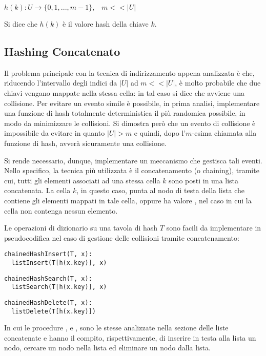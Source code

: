 \(h(k):U\to \{0,1,..., m-1\},\;\;\; m<<|U|\)

Si dice che \(h(k)\) è il valore hash della chiave \(k\).

\subsection{Hashing Concatenato}

Il problema principale con la tecnica di indirizzamento appena analizzata è che, riducendo l'intervallo degli indici da \(|U|\) ad \(m<<|U|\), è molto probabile che due chiavi vengano mappate nella stessa cella: in tal caso si dice che avviene una collisione. Per evitare un evento simile è possibile, in prima analisi, implementare una funzione di hash totalmente deterministica il più randomica possibile, in modo da minimizzare le collisioni. Si dimostra però che un evento di collisione è impossibile da evitare in quanto \(|U| > m\) e quindi, dopo l'\(m\)-esima chiamata alla funzione di hash, avverà sicuramente una collisione. 

Si rende necessario, dunque, implementare un meccanismo che gestisca tali eventi. Nello specifico, la tecnica più utilizzata è il concatenamento (o chaining), tramite cui, tutti gli elementi associati ad una stessa cella \(k\) sono posti in una lista concatenata. La cella \(k\), in questo caso, punta al nodo di testa della lista che contiene gli elementi mappati in tale cella, oppure ha valore , nel caso in cui la cella non contenga nessun elemento. 

Le operazioni di dizionario su una tavola di hash \(T\) sono facili da implementare in pseudocodifica nel caso di gestione delle collisioni tramite concatenamento:

\begin{lstlisting}
chainedHashInsert(T, x):
  listInsert(T[h(x.key)], x)
\end{lstlisting}

\begin{lstlisting}
chainedHashSearch(T, x):
  listSearch(T[h(x.key)], x)
\end{lstlisting}

\begin{lstlisting}
chainedHashDelete(T, x):
  listDelete(T[h(x.key)])
\end{lstlisting}

In cui le procedure ,  e , sono le stesse analizzate nella sezione delle liste concatenate e hanno il compito, rispettivamente, di inserire in testa alla lista un nodo, cercare un nodo nella lista ed eliminare un nodo dalla lista. 

